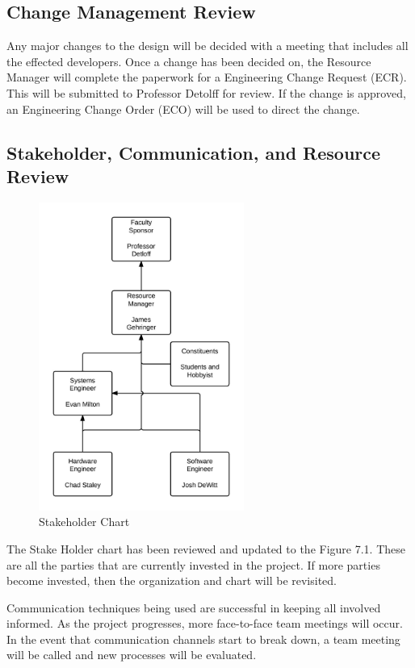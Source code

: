 \subsection{Change Management Review}
Any major changes to the design will be decided with a meeting that includes all the effected developers.
Once a change has been decided on, the Resource Manager will complete the paperwork for a Engineering Change Request (ECR).
This will be submitted to Professor Detolff for review.
If the change is approved, an Engineering Change Order (ECO) will be used to direct the change.

\subsection{Stakeholder, Communication, and Resource Review}
\begin{figure}[p]
\centering
\includegraphics[width=0.6\textwidth]{shc.jpeg}
\caption{Stakeholder Chart}
\label{fig:Stakeholder Chart}
\end{figure}
The Stake Holder chart has been reviewed and updated to the Figure 7.1.
These are all the parties that are currently invested in the project. 
If more parties become invested, then the organization and chart will be revisited. 

Communication techniques being used are successful in keeping all involved informed.
As the project progresses, more face-to-face team meetings will occur.
In the event that communication channels start to break down, a team meeting will be called and new processes will be evaluated. 


